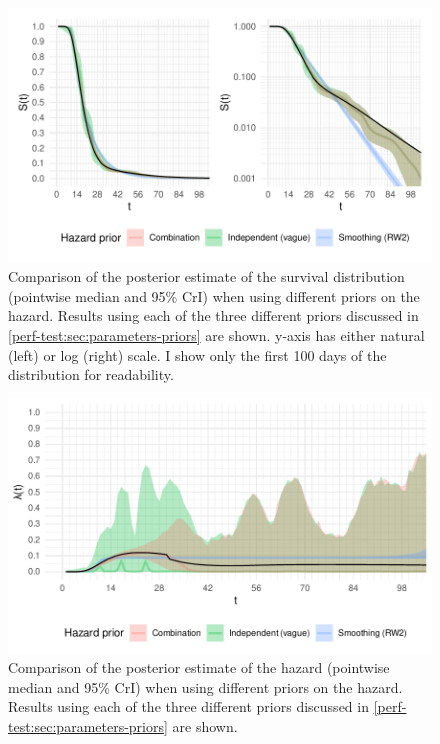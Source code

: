 \documentclass[thesis.tex]{subfiles}
\begin{document}
\begin{figure}
  \centering \includegraphics{cis-perfect-testing/survival-results}
  \caption[Comparison of survival function estimates under different priors]{Comparison of the posterior estimate of the survival distribution (pointwise median and 95\% CrI) when using different priors on the hazard. Results using each of the three different priors discussed in \cref{perf-test:sec:parameters-priors} are shown. y-axis has either natural (left) or log (right) scale. I show only the first 100 days of the distribution for readability. \label{perf-test:fig:survival-results}}
\end{figure}

\begin{figure}
  \centering \includegraphics{cis-perfect-testing/hazard-results}
  \caption[Comparison of hazard estimates under different priors]{Comparison of the posterior estimate of the hazard (pointwise median and 95\% CrI) when using different priors on the hazard. Results using each of the three different priors discussed in \cref{perf-test:sec:parameters-priors} are shown. \label{perf-test:fig:hazard-results}}
\end{figure}
\end{document}

